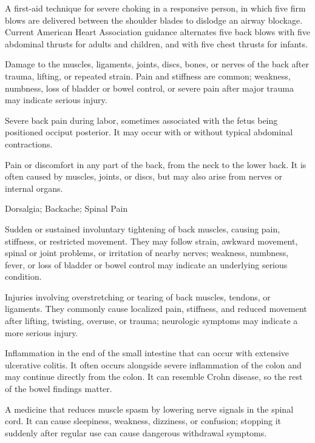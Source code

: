  A first-aid technique for severe choking in a responsive person, in which five firm blows are delivered between the shoulder blades to dislodge an airway blockage. Current American Heart Association guidance alternates five back blows with five abdominal thrusts for adults and children, and with five chest thrusts for infants.

 Damage to the muscles, ligaments, joints, discs, bones, or nerves of the back after trauma, lifting, or repeated strain. Pain and stiffness are common; weakness, numbness, loss of bladder or bowel control, or severe pain after major trauma may indicate serious injury.

 Severe back pain during labor, sometimes associated with
the fetus being positioned occiput posterior. It may occur with or without
typical abdominal contractions.

 Pain or discomfort in any part of the back, from the neck to the lower back. It is often caused by muscles, joints, or discs, but may also arise from nerves or internal organs.

\synonyms
Dorsalgia; Backache; Spinal Pain

 Sudden or sustained involuntary tightening of back muscles, causing pain, stiffness, or restricted movement. They may follow strain, awkward movement, spinal or joint problems, or irritation of nearby nerves; weakness, numbness, fever, or loss of bladder or bowel control may indicate an underlying serious condition.

 Injuries involving overstretching or tearing of back muscles, tendons, or ligaments. They commonly cause localized pain, stiffness, and reduced movement after lifting, twisting, overuse, or trauma; neurologic symptoms may indicate a more serious injury.

 Inflammation in the end of the small intestine
that can occur with extensive ulcerative colitis. It often occurs alongside
severe inflammation of the colon and may continue directly from the colon.
It can resemble Crohn disease, so the rest of the bowel findings matter.

 A medicine that reduces muscle spasm by lowering nerve signals in the spinal cord. It can cause sleepiness, weakness, dizziness, or confusion; stopping it suddenly after regular use can cause dangerous withdrawal symptoms.

